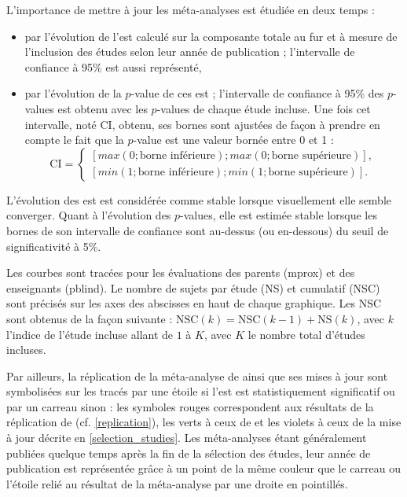 L'importance de mettre à jour les méta-analyses est étudiée en deux temps :
\begin{itemize}
\item par l'évolution de l'\gls{est} calculé sur la composante totale au fur et à mesure de l'inclusion des études selon leur année de publication ; l'intervalle de confiance à 95\% est 
aussi représenté,
\item par l'évolution de la $p$-value de ces \gls{est} ; l'intervalle de confiance à 95\% des $p$-values
est obtenu avec les $p$-values de chaque étude incluse. Une fois cet intervalle, noté CI, obtenu, ses bornes sont ajustées de façon à prendre en compte le fait 
que la $p$-value est une valeur bornée entre 0 et 1 \citep{Mandelkern2002} : 
\begin{equation}
\label{eq:metareview_confidence_interval_evolitio_p_value}
\text{CI} = \begin{cases}
           [max(0;\text{borne inférieure}) ; max(0;\text{borne supérieure})], \\
					 [min(1;\text{borne inférieure}) ; min(1;\text{borne supérieure})].
					  \end{cases}
\end{equation}
\end{itemize}

L'évolution des \gls{est} est considérée comme stable lorsque visuellement elle semble converger. Quant à l'évolution des $p$-values, elle est
estimée stable lorsque les bornes de son intervalle de confiance sont au-dessus (ou en-dessous) du seuil de significativité à 5\%.

Les courbes sont tracées pour les évaluations des parents (\gls{mprox}) et des enseignants (\gls{pblind}). Le nombre de sujets par étude (NS) et cumulatif (NSC) sont précisés sur les axes 
des abscisses en haut de chaque graphique. Les NSC sont obtenus de la façon suivante : $\text{NSC}(k) = \text{NSC}(k - 1) + \text{NS}(k)$, avec $k$ l'indice de l'étude incluse
allant de $1$ à $K$, avec $K$ le nombre total d'études incluses.
 
Par ailleurs, la réplication de la méta-analyse de \citet{Cortese2016} ainsi que ses mises
à jour sont symbolisées sur les tracés par une étoile si l'\gls{est} est statistiquement significatif ou par un carreau sinon : les symboles
rouges correspondent aux résultats de la réplication de \citet{Cortese2016} (cf. \ref{replication}), les verts à ceux de \citet{Bussalb2019clinical} et les violets à ceux de la mise à jour décrite en \ref{selection_studies}. Les méta-analyses
étant généralement publiées quelque temps après la fin de la sélection des études, leur année de publication est représentée grâce à un point de la même couleur que le carreau ou
l'étoile relié au résultat de la méta-analyse par une droite en pointillés. 

